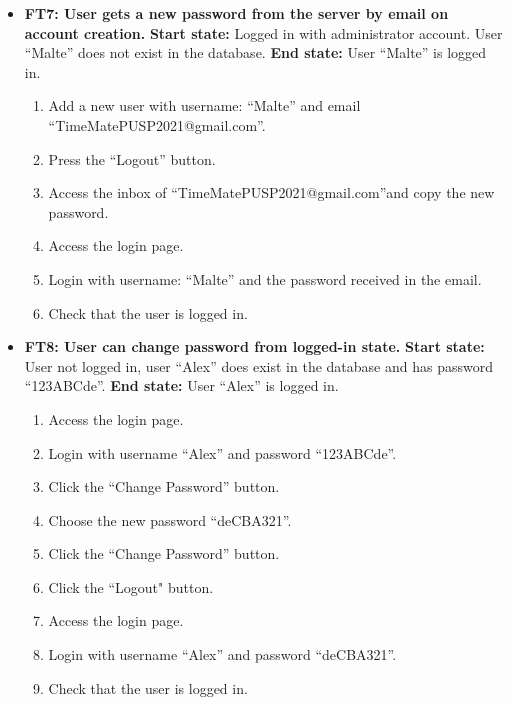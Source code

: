 \documentclass{article}
\begin{document}
\begin{itemize}
		\item \textbf{FT7: User gets a new password from the server by email on account creation. } \newline
		\textbf{Start state:} Logged in with administrator account. User “Malte” does not exist in the database.  \newline
		\textbf{End state:}  User “Malte” is logged in.  
		\begin{enumerate}
			\item Add a new user with username: “Malte” and email “TimeMatePUSP2021@gmail.com”.
			\item Press the “Logout” button. 
			\item Access the inbox of “TimeMatePUSP2021@gmail.com”and copy the new password.
			\item Access the login page.
			\item Login with username: “Malte” and the password received in the email.
			\item Check that the user is logged in.
		\end{enumerate}
		
		\item \textbf{FT8: User can change password from logged-in state.} \newline
		\textbf{Start state:} User not logged in, user “Alex” does exist in the database and has password “123ABCde”. \newline
		\textbf{End state:} User “Alex” is logged in. 
		\begin{enumerate}
			\item Access the login page.
			\item Login with username “Alex” and password “123ABCde”.
			\item Click the “Change Password” button.
			\item Choose the new password “deCBA321”.
			\item Click the “Change Password” button.
			\item Click the “Logout" button.
			\item Access the login page.
			\item Login with username “Alex” and password “deCBA321”.
			\item Check that the user is logged in.
		\end{enumerate}
		

\end{itemize}
\end{document}
